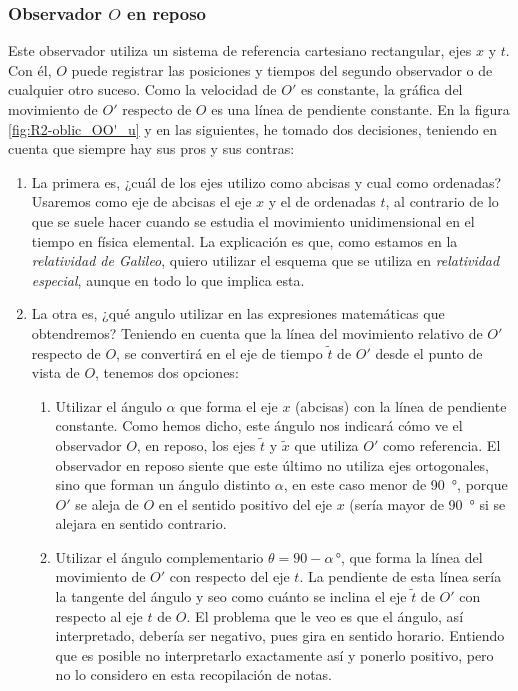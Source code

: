 \subsubsection{Observador $O$ en reposo}
Este observador utiliza un sistema de referencia cartesiano rectangular, ejes $x$ y $t$.
Con él, $O$ puede registrar las posiciones y tiempos del segundo observador o de
cualquier otro suceso.
Como la velocidad de $O'$ es constante, la gráfica del movimiento de $O'$ respecto de $O$
es una línea de pendiente constante. En la figura \ref{fig:R2-oblic_OO'_u} y en las
siguientes, he tomado dos decisiones, teniendo en cuenta que siempre hay sus pros y sus
contras:
\begin{enumerate}
\item La primera es, ¿cuál de los ejes utilizo como abcisas y cual como ordenadas?
  Usaremos como eje de abcisas el eje $x$ y el de ordenadas $t$, al contrario de lo que
  se suele hacer cuando se estudia el movimiento unidimensional en el tiempo en física
  elemental. La explicación es que, como estamos en la \emph{relatividad de Galileo},
  quiero utilizar el esquema que se utiliza en \emph{relatividad especial}, aunque en
  todo lo que implica esta.
  
\item La otra es, ¿qué angulo utilizar en las expresiones matemáticas que obtendremos?
  Teniendo en cuenta que la línea del movimiento relativo de $O'$ respecto de $O$,
  se convertirá en el eje de tiempo $\tilde{t}$ de $O'$ desde el punto de vista de $O$,
  tenemos dos opciones:
  \begin{enumerate}
  \item Utilizar el ángulo $\alpha$ que forma el eje $x$ (abcisas) con la línea de
    pendiente constante. Como hemos dicho, este ángulo nos indicará cómo ve el
    observador $O$, en reposo, los ejes $\tilde{t}$ y $\tilde{x}$ que utiliza $O'$ como
    referencia. El observador en reposo siente que este último no utiliza ejes
    ortogonales, sino que forman un ángulo distinto $\alpha$, en este caso menor de
    \qty{90}{\degree}, porque $O'$ se aleja de $O$ en el sentido positivo del eje $x$
    (sería mayor de \qty{90}{\degree} si se alejara en sentido contrario.
  \item Utilizar el ángulo complementario $\theta = 90-\alpha\,\unit{\degree}$, que
    forma la línea del movimiento de $O'$ con respecto del eje $t$. La pendiente de esta
    línea sería la tangente del ángulo y seo como cuánto se inclina el eje $\tilde{t}$
    de $O'$ con respecto al eje $t$ de $O$. El problema que le veo es que el ángulo, así
    interpretado, debería ser negativo, pues gira en sentido horario. Entiendo que es
    posible no interpretarlo exactamente así y ponerlo positivo, pero no lo considero en
    esta recopilación de notas.
  \end{enumerate}
\end{enumerate}


